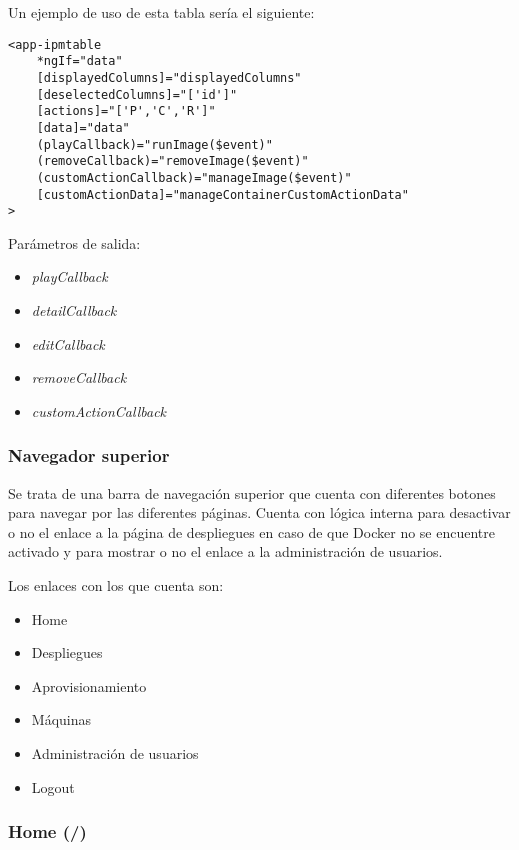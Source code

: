 Un ejemplo de uso de esta tabla sería el siguiente:

\begin{lstlisting}
<app-ipmtable
	*ngIf="data"
	[displayedColumns]="displayedColumns"
	[deselectedColumns]="['id']"
	[actions]="['P','C','R']"
	[data]="data"
	(playCallback)="runImage($event)"
	(removeCallback)="removeImage($event)"
	(customActionCallback)="manageImage($event)"
	[customActionData]="manageContainerCustomActionData"
>
\end{lstlisting}



\bigskip
Parámetros de salida:
\begin{itemize}
	\item \textit{playCallback}
	\item \textit{detailCallback}
	\item \textit{editCallback}
	\item \textit{removeCallback}
	\item \textit{customActionCallback}
\end{itemize}



\subsubsection{Navegador superior}

Se trata de una barra de navegación superior que cuenta con diferentes botones para navegar por las diferentes páginas. Cuenta con lógica interna para desactivar o no el enlace a la página de despliegues en caso de que Docker no se encuentre activado y para mostrar o no el enlace a la administración de usuarios.

\bigskip
Los enlaces con los que cuenta son:
\begin{itemize}
	\item Home
	\item Despliegues
	\item Aprovisionamiento
	\item Máquinas
	\item Administración de usuarios
	\item Logout
\end{itemize}



\subsubsection{Home (/)}

